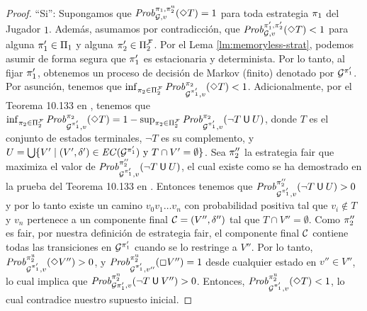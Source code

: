 \begin{proof}
``Si'': Supongamos que $\mathit{Prob}^{\pi_{1}, \pi^{\mathrm{u}}_{2}}_{\mathcal{G},v}(\Diamond T)=1$ para toda estrategia $\pi_{1}$ del Jugador $1$.  Además, 
asumamos por contradicción, que
$\mathit{Prob}^{\pi_{1}', \pi_{2}'}_{\mathcal{G},v}(\Diamond T) < 1$ para alguna $\pi_{1}'\in \Pi_{1}$ y alguna $\pi_{2}'\in \Pi^{\mathcal{F}}_{2}$. 
Por el Lema \ref{lm:memoryless-strat}, podemos asumir de forma segura que $\pi_{1}'$ es estacionaria y determinista.
Por lo tanto, al fijar $\pi_{1}'$, obtenemos un proceso de decisión de Markov (finito) denotado por $\mathcal{G}^{\pi_{1}'}$.
Por asunción, tenemos que
$\inf_{\pi_{2} \in \Pi^{\mathcal{F}}_{2}} \mathit{Prob}^{\pi_{2}}_{\mathcal{G}^{\pi_{1}'},v}(\Diamond T) < 1 $. Adicionalmente, por el Teorema 10.133 en \cite{BaierK08}, tenemos que $\inf_{ \pi_{2} \in \Pi^{\mathcal{F}}_{2}}\mathit{Prob}^{\pi_{2}}_{\mathcal{G}^{\pi_{1}'},v}(\Diamond T) = 1 - \sup_{\pi_{2} \in \Pi^{\mathcal{F}}_{2}} \mathit{Prob}^{\pi_{2}}_{\mathcal{G}^{\pi_{1}'},v}(\neg T \mathbin{\textsf{U}} U)$, donde $T$ es el conjunto de estados terminales,  $\neg T$ es su complemento, y
$U = \bigcup \{ V' \mid (V', \delta') \in \mathit{EC}(\mathcal{G}^{\pi_{1}'}) \text{ y }  T \cap V' = \emptyset\}$.
Sea $\pi_{2}''$ la estrategia fair que maximiza el valor de $\mathit{Prob}^{\pi_{2}''}_{\mathcal{G}^{\pi_{1}'},v}(\neg T \mathbin{\textsf{U}} U)$, el cual existe como se ha demostrado en la prueba del Teorema 10.133 en \cite{BaierK08}.
Entonces tenemos que $\mathit{Prob}^{\pi_{2}''}_{\mathcal{G}^{\pi_{1}'},v}(\neg T \mathbin{\textsf{U}} U) > 0$ y por lo tanto existe
un camino $v_0 v_1 \dots v_n$ con probabilidad positiva tal que $v_i \notin T$ y $v_n$ pertenece a un componente final $\mathcal{C} = (V'', \delta'')$
tal que $T \cap V'' = \emptyset$. Como $\pi_{2}''$ es fair, por nuestra definición de estrategia fair, el componente final $\mathcal{C}$ contiene todas las transiciones en $\mathcal{G}^{\pi_{1}'}$ cuando se lo restringe a $V''$.
Por lo tanto, $\mathit{Prob}^{\pi^{\mathrm{u}}_{2}}_{\mathcal{G}^{\pi_{1}'},v}(\Diamond V'') > 0$, y 
$\mathit{Prob}^{\pi^{\mathrm{u}}_{2}}_{\mathcal{G}^{\pi_{1}'},v''}(\Box V'') = 1 $ 
desde cualquier estado en $v'' \in V''$, lo cual implica que $\mathit{Prob}^{\pi^{\mathrm{u}}_{2}}_{\mathcal{G}{\pi_{1}'},v}(\neg T \mathbin{\textsf{U}} V'') > 0$. 
Entonces, $\mathit{Prob}^{\pi^{\mathrm{u}}_{2}}_{\mathcal{G}^{\pi_{1}'},v}(\Diamond T) < 1$, lo cual contradice nuestro supuesto inicial.


\end{proof}
